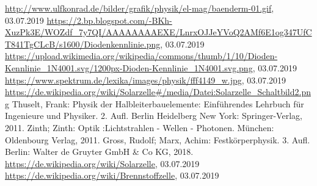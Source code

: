 \begin{thebibliography}{xxx}
		\url{http://www.ulfkonrad.de/bilder/grafik/physik/el-mag/baenderm-01.gif},
		03.07.2019
		\url{https://2.bp.blogspot.com/-BKh-XuzPk3E/WOZdf_7y7QI/AAAAAAAAEXE/LnrxOJJeYVoQ2AMf6E1og347UfCT841TgCLcB/s1600/Diodenkennlinie.png},
		03.07.2019
		\url{https://upload.wikimedia.org/wikipedia/commons/thumb/1/10/Dioden-Kennlinie_1N4001.svg/1200px-Dioden-Kennlinie_1N4001.svg.png},
		03.07.2019
		\url{https://www.spektrum.de/lexika/images/physik/fff4149_w.jpg}, 03.07.2019
		\url{https://de.wikipedia.org/wiki/Solarzelle#/media/Datei:Solarzelle_Schaltbild2.png}
	 Thuselt, Frank: Physik der Halbleiterbauelemente: Einführendes Lehrbuch für Ingenieure und Physiker. 2. Aufl. Berlin Heidelberg New York: Springer-Verlag, 2011.
	 Zinth; Zinth: Optik :Lichtstrahlen - Wellen - Photonen. München: Oldenbourg Verlag, 2011.
	 Gross, Rudolf; Marx, Achim: Festkörperphysik. 3. Aufl.
		Berlin: Walter de Gruyter GmbH \& Co KG, 2018. 
	 \url{https://de.wikipedia.org/wiki/Solarzelle}, 03.07.2019
	 \url{https://de.wikipedia.org/wiki/Brennstoffzelle},
		03.07.2019
\end{thebibliography}
 